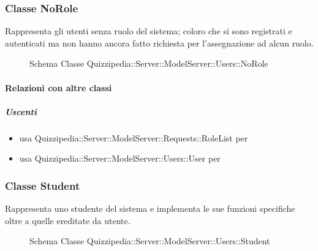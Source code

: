 \subsubsection{Classe NoRole}
Rappresenta gli utenti senza ruolo del sistema; coloro che si sono registrati e autenticati ma non hanno ancora fatto richiesta per l'assegnazione ad alcun ruolo.
\begin{figure}[H]
\centering
\noindent{}
\caption[Schema Classe NoRole]{Schema Classe Quizzipedia::Server::ModelServer::Users::NoRole}
\end{figure}
\paragraph{Relazioni con altre classi}
\subparagraph{Uscenti}
\begin{itemize}
\item usa Quizzipedia::Server::ModelServer::Requests::RoleList per 
\item usa Quizzipedia::Server::ModelServer::Users::User per 
\end{itemize}
\subsubsection{Classe Student}
Rappresenta uno studente del sistema e implementa le sue funzioni specifiche oltre a quelle ereditate da utente.
\begin{figure}[H]
\centering
\noindent{}
\caption[Schema Classe Student]{Schema Classe Quizzipedia::Server::ModelServer::Users::Student}
\end{figure}
